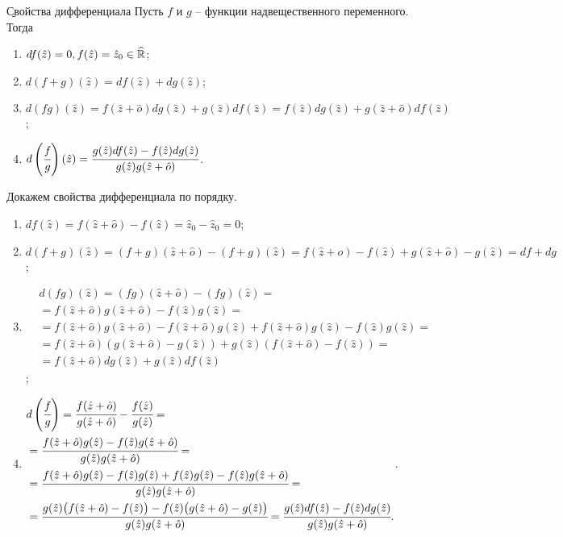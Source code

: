 \b{Свойства дифференциала} Пусть $f$ и $g$ -- функции надвещественного переменного. Тогда
\begin{enumerate}
	\item $df(\hat{z})=0, f(\hat{z})=\hat{z}_0\in\widehat{\mathbb{R}}$;
	\item $d(f+g)(\hat{z})=df(\hat{z})+dg(\hat{z})$;
	\item $d(fg)(\hat{z})=f(\hat{z}+\hat{o})dg(\hat{z})+g(\hat{z})df(\hat{z})=f(\hat{z})dg(\hat{z})+g(\hat{z}+\hat{o})df(\hat{z})$;
	\item $d\left({\cfrac{f}{g}}\right)(\hat{z})=\cfrac{g(\hat{z})df(\hat{z})-f(\hat{z})dg(\hat{z})}{g(\hat{z})g(\hat{z}+\hat{o})}$.
\end{enumerate}
Докажем свойства дифференциала по порядку.
\begin{enumerate}
	\item $df(\hat{z})=f(\hat{z}+\hat{o})-f(\hat{z})=\hat{z}_0-\hat{z}_0=0$;
	\item $d(f+g)(\hat{z})=(f+g)(\hat{z}+\hat{o})-(f+g)(\hat{z})=f(\hat{z}+\hat{o})-f(\hat{z})+g(\hat{z}+\hat{o})-g(\hat{z})=df+dg$;
	\item $\begin{aligned}
		& d(fg)(\hat{z})=(fg)(\hat{z}+\hat{o})-(fg)(\hat{z})=\\
		& =f(\hat{z}+\hat{o})g(\hat{z}+\hat{o})-f(\hat{z})g(\hat{z})=\\
		& =f(\hat{z}+\hat{o})g(\hat{z}+\hat{o})-f(\hat{z}+\hat{o})g(\hat{z})+f(\hat{z}+\hat{o})g(\hat{z})-f(\hat{z})g(\hat{z})=\\
		& =f(\hat{z}+\hat{o})\left(g(\hat{z}+\hat{o})-g(\hat{z})\right)+g(\hat{z})\left(f(\hat{z}+\hat{o})-f(\hat{z})\right)=\\
		& =f(\hat{z}+\hat{o})dg(\hat{z})+g(\hat{z})df(\hat{z})
		\end{aligned}$;
	\item $\begin{aligned}
		& d\left({\cfrac{f}{g}}\right)=\cfrac{f(\hat{z}+\hat{o})}{g(\hat{z}+\hat{o})}-\cfrac{f(\hat{z})}{g(\hat{z})}=\\
		& =\cfrac{f(\hat{z}+\hat{o})g(\hat{z})-f(\hat{z})g(\hat{z}+\hat{o})}{g(\hat{z})g(\hat{z}+\hat{o})}=\\
		& =\cfrac{f(\hat{z}+\hat{o})g(\hat{z})-f(\hat{z})g(\hat{z})+f(\hat{z})g(\hat{z})-f(\hat{z})g(\hat{z}+\hat{o})}{g(\hat{z})g(\hat{z}+\hat{o})}= \\
		& =\cfrac{g(\hat{z})\big(f(\hat{z}+\hat{o})-f(\hat{z})\big)-f(\hat{z})\big(g(\hat{z}+\hat{o})-g(\hat{z})\big)}{g(\hat{z})g(\hat{z}+\hat{o})}=\cfrac{g(\hat{z})df(\hat{z})-f(\hat{z})dg(\hat{z})}{g(\hat{z})g(\hat{z}+\hat{o})}.
		\end{aligned}$.
\end{enumerate}

